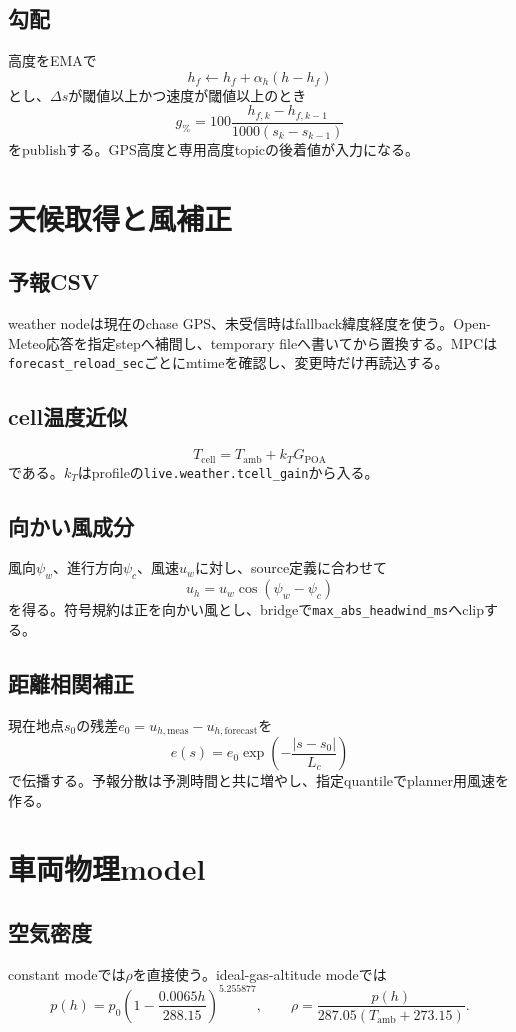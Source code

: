 \documentclass[a4paper,10pt,oneside]{book}
\begin{document}
\section{勾配}
高度をEMAで
\[
h_f\leftarrow h_f+\alpha_h(h-h_f)
\]
とし、$\Delta s$が閾値以上かつ速度が閾値以上のとき
\[
g_{\%}=100\frac{h_{f,k}-h_{f,k-1}}{1000(s_k-s_{k-1})}
\]
をpublishする。GPS高度と専用高度topicの後着値が入力になる。

\chapter{天候取得と風補正}
\section{予報CSV}
weather nodeは現在のchase GPS、未受信時はfallback緯度経度を使う。Open-Meteo応答を指定stepへ補間し、temporary fileへ書いてから置換する。MPCは\texttt{forecast\_reload\_sec}ごとにmtimeを確認し、変更時だけ再読込する。

\section{cell温度近似}
\[
T_{\mathrm{cell}}=T_{\mathrm{amb}}+k_T G_{\mathrm{POA}}
\]
である。$k_T$はprofileの\texttt{live.weather.tcell\_gain}から入る。

\section{向かい風成分}
風向$\psi_w$、進行方向$\psi_c$、風速$u_w$に対し、source定義に合わせて
\[
u_h=u_w\cos(\psi_w-\psi_c)
\]
を得る。符号規約は正を向かい風とし、bridgeで\texttt{max\_abs\_headwind\_ms}へclipする。

\section{距離相関補正}
現在地点$s_0$の残差$e_0=u_{h,\mathrm{meas}}-u_{h,\mathrm{forecast}}$を
\[
e(s)=e_0\exp\left(-\frac{|s-s_0|}{L_c}\right)
\]
で伝播する。予報分散は予測時間と共に増やし、指定quantileでplanner用風速を作る。

\chapter{車両物理model}
\section{空気密度}
constant modeでは$\rho$を直接使う。ideal-gas-altitude modeでは
\[
p(h)=p_0\left(1-\frac{0.0065h}{288.15}\right)^{5.255877},\qquad
\rho=\frac{p(h)}{287.05(T_{\mathrm{amb}}+273.15)}.
\]
\end{document}
